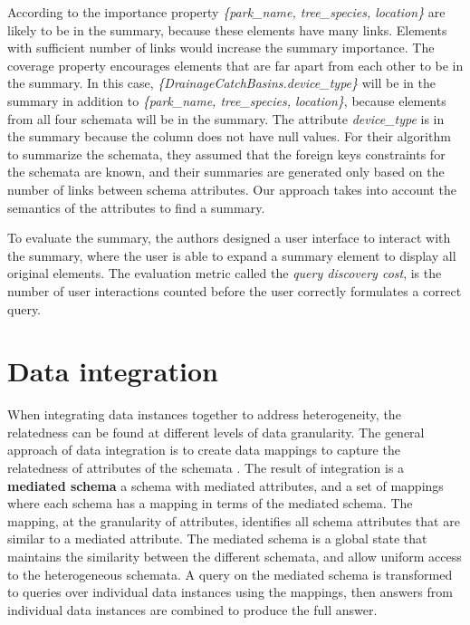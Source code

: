 According to the importance property \textit{\{park\_name, tree\_species, location\}} are likely to be in the summary, because these elements have many links. Elements with sufficient number of links would increase the summary importance. The coverage property encourages elements that are far apart from each other to be in the summary. In this case, \textit{\{DrainageCatchBasins.device\_type\}} will be in the summary in addition to \textit{\{park\_name, tree\_species, location\}}, because elements from all four schemata will be in the summary. The attribute \textit{device\_type} is in the summary because the column does not have null values. For their algorithm to summarize the schemata, they assumed that the foreign keys constraints for the schemata are known, and their summaries are generated only based on the number of links between schema attributes. Our approach takes into account the semantics of the attributes to find a summary.

To evaluate the summary, the authors designed a user interface to interact with the summary, where the user is able to expand a summary element to display all original elements. The evaluation metric called the \textit{query discovery cost}, is the number of user interactions counted before the user correctly formulates a correct query.

\section{Data integration}
\label{sec:DataIntegration}

When integrating data instances together to address heterogeneity, the relatedness can be found at different levels of data granularity. The general approach of data integration is to create data mappings to capture the relatedness of attributes of the schemata \cite{Lenzerini2002Data}. The result of integration is a \textbf{\gls{mediated schema}} a schema with mediated attributes, and a set of mappings where each schema has a mapping in terms of the mediated schema. The mapping, at the granularity of attributes, identifies all schema attributes that are similar to a mediated attribute. The mediated schema is a global state that maintains the similarity between the different schemata, and allow uniform access to the heterogeneous schemata. A query on the mediated schema is transformed to queries over individual data instances using the mappings, then answers from individual data instances are combined to produce the full answer.

